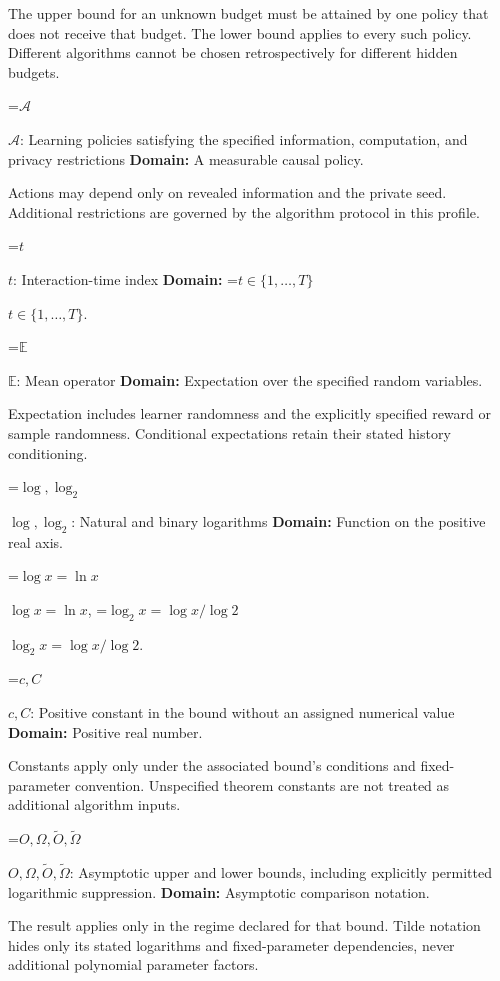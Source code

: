 \documentclass[10pt,a4paper]{article}
\newcommand{\AtlasMath}[1]{\par\begingroup\centering\setbox0=\hbox{$\displaystyle #1$}\ifdim\wd0>1.4\linewidth\typeout{ATLAS WIDE FORMULA: \the\wd0}\fi\ifdim\wd0>\linewidth\resizebox{\linewidth}{!}{\box0}\else\box0\fi\par\endgroup}
\newcommand{\AtlasInlineMath}[1]{\begingroup\setbox0=\hbox{$#1$}\ifdim\wd0>.4\linewidth\endgroup\AtlasMath{#1}\else\endgroup$#1$\fi}
\begin{document}
The upper bound for an unknown budget must be attained by one policy that does not receive that budget. The lower bound applies to every such policy. Different algorithms cannot be chosen retrospectively for different hidden budgets.



\AtlasInlineMath{\mathcal A}: Learning policies satisfying the specified information, computation, and privacy restrictions \textbf{Domain:} A measurable causal policy.



Actions may depend only on revealed information and the private seed. Additional restrictions are governed by the algorithm protocol in this profile.



\AtlasInlineMath{t}: Interaction-time index \textbf{Domain:} \AtlasInlineMath{t\in\{1,\ldots,T\}}.



\AtlasInlineMath{\mathbb E}: Mean operator \textbf{Domain:} Expectation over the specified random variables.



Expectation includes learner randomness and the explicitly specified reward or sample randomness. Conditional expectations retain their stated history conditioning.



\AtlasInlineMath{\log,\log_2}: Natural and binary logarithms \textbf{Domain:} Function on the positive real axis.



\AtlasInlineMath{\log x=\ln x}, \AtlasInlineMath{\log_2x=\log x/\log2}.



\AtlasInlineMath{c,C}: Positive constant in the bound without an assigned numerical value \textbf{Domain:} Positive real number.



Constants apply only under the associated bound’s conditions and fixed-parameter convention. Unspecified theorem constants are not treated as additional algorithm inputs.



\AtlasInlineMath{O,\Omega,\widetilde O,\widetilde\Omega}: Asymptotic upper and lower bounds, including explicitly permitted logarithmic suppression. \textbf{Domain:} Asymptotic comparison notation.



The result applies only in the regime declared for that bound. Tilde notation hides only its stated logarithms and fixed-parameter dependencies, never additional polynomial parameter factors.
\end{document}

